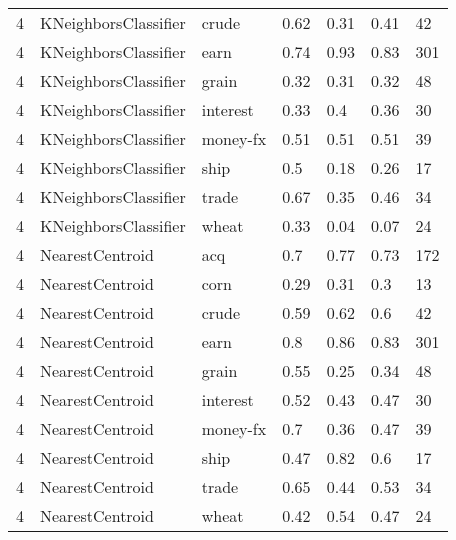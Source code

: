 \documentclass{article}
\begin{document}
\begin{table}[h]
\begin{tabular}{lllllll}
4             & KNeighborsClassifier   & crude           & 0.62               & 0.31            & 0.41              & 42               \\
4             & KNeighborsClassifier   & earn            & 0.74               & 0.93            & 0.83              & 301              \\
4             & KNeighborsClassifier   & grain           & 0.32               & 0.31            & 0.32              & 48               \\
4             & KNeighborsClassifier   & interest        & 0.33               & 0.4             & 0.36              & 30               \\
4             & KNeighborsClassifier   & money-fx        & 0.51               & 0.51            & 0.51              & 39               \\
4             & KNeighborsClassifier   & ship            & 0.5                & 0.18            & 0.26              & 17               \\
4             & KNeighborsClassifier   & trade           & 0.67               & 0.35            & 0.46              & 34               \\
4             & KNeighborsClassifier   & wheat           & 0.33               & 0.04            & 0.07              & 24               \\
4             & NearestCentroid        & acq             & 0.7                & 0.77            & 0.73              & 172              \\
4             & NearestCentroid        & corn            & 0.29               & 0.31            & 0.3               & 13               \\
4             & NearestCentroid        & crude           & 0.59               & 0.62            & 0.6               & 42               \\
4             & NearestCentroid        & earn            & 0.8                & 0.86            & 0.83              & 301              \\
4             & NearestCentroid        & grain           & 0.55               & 0.25            & 0.34              & 48               \\
4             & NearestCentroid        & interest        & 0.52               & 0.43            & 0.47              & 30               \\
4             & NearestCentroid        & money-fx        & 0.7                & 0.36            & 0.47              & 39               \\
4             & NearestCentroid        & ship            & 0.47               & 0.82            & 0.6               & 17               \\
4             & NearestCentroid        & trade           & 0.65               & 0.44            & 0.53              & 34               \\
4             & NearestCentroid        & wheat           & 0.42               & 0.54            & 0.47              & 24               \\\end{tabular}
\end{table}
\end{document}
